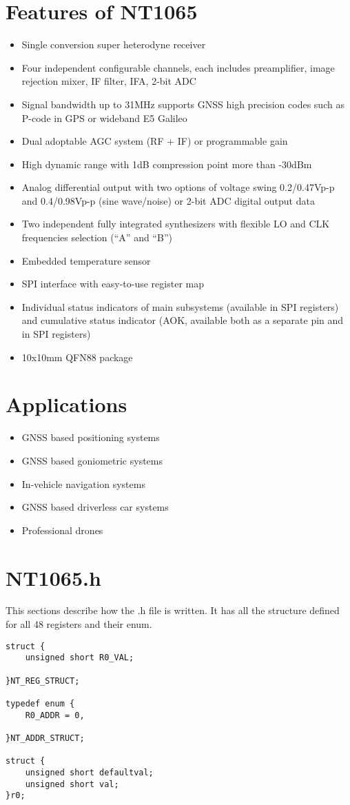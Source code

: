 \documentclass[12pt,a4paper,onecolumn]{article}
\begin{document}
\section{Features of NT1065}
\begin{itemize}
  \item Single conversion super heterodyne receiver
  \item Four independent configurable channels, each includes preamplifier, image rejection mixer, IF filter, IFA, 2-bit ADC
  \item Signal bandwidth up to 31MHz supports GNSS high precision codes such as P-code in GPS or wideband E5 Galileo
  \item  Dual adoptable AGC system (RF + IF) or programmable gain
  \item  High dynamic range with 1dB compression point more than -30dBm
  \item Analog differential output with two options of voltage swing 0.2/0.47Vp-p and 0.4/0.98Vp-p (sine wave/noise) or 2-bit ADC digital output data
  \item Two independent fully integrated synthesizers with flexible LO and CLK frequencies selection (“A” and “B”)
  \item Embedded temperature sensor
  \item SPI interface with easy-to-use register map
  \item Individual status indicators of main subsystems (available in SPI registers) and cumulative status indicator (AOK, available both as a separate pin and in SPI registers)
  \item 10x10mm QFN88 package
\end{itemize}

\section{Applications}
\begin{itemize}
  \item GNSS based positioning systems 
  \item GNSS based goniometric systems 
  \item In-vehicle navigation systems 
  \item GNSS based driverless car systems 
  \item  Professional drones
\end{itemize}

\section{NT1065.h}
This sections describe how the .h file is written. It has all the structure defined for all 48 registers and their enum. 
\begin{center}
\begin{verbatim}
struct {
    unsigned short R0_VAL;
   
}NT_REG_STRUCT;

typedef enum {
    R0_ADDR = 0,
   
}NT_ADDR_STRUCT;

struct {
    unsigned short defaultval;
    unsigned short val;
}r0;
\end{verbatim}
\end{center}
\end{document}
